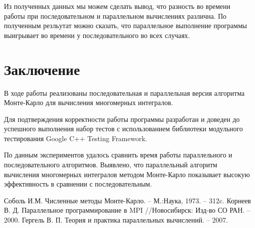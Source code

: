 \documentclass{report}
\begin{document}
\par Из полученных данных мы можем сделать вывод, что разность во времени работы при последовательном и параллельном вычислениях различна. По полученным резльутат можно сказать, что параллельное выполнение программы выигрывает во времени у последовательного во всех случаях.
\newpage

\section*{Заключение}
В ходе работы реализованы последовательная и параллельная версия алгоритма Монте-Карло для вычисления многомерных интегралов.
\par Для подтверждения корректности работы программы разработан и доведен до успешного
выполнения набор тестов с использованием библиотеки модульного тестирования Google C++
Testing Framework.
\par По данным экспериментов удалось сравнить время работы параллельного и последовательного
алгоритмов. Выявлено, что параллельный алгоритм вычисления многомерных интегралов методом Монте-Карло показывает высокую эффективность в сравнении с последовательным.
\newpage

\begin{thebibliography}{1}
Соболь И.М. Численные методы Монте-Карло. – М.:Наука, 1973. – 312c.
Корнеев В. Д. Параллельное программирование в MPI //Новосибирск: Изд-во СО РАН. – 2000.
Гергель В. П. Теория и практика параллельных вычислений. – 2007.
\end{thebibliography}
\newpage

\end{document}
